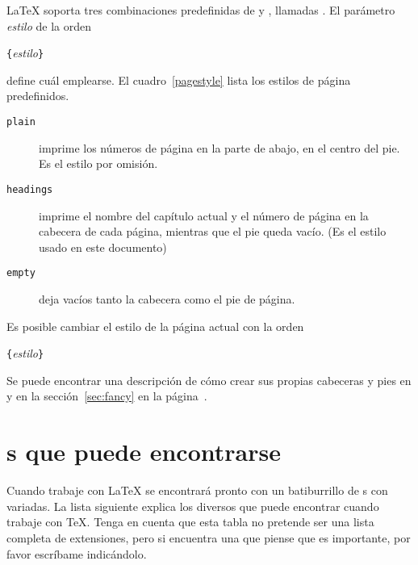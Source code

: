 \LaTeX{} soporta tres combinaciones predefinidas de  y , llamadas .  El parámetro \emph{estilo} de la orden   
\begin{lscommand}
\verb|{|\emph{estilo}\verb|}|
\end{lscommand}
define cuál emplearse. 
El cuadro~\ref{pagestyle} lista los estilos de página predefinidos.

\begin{table}[!hbp]
\caption{Los estilos de página predifinidos de \LaTeX.} \label{pagestyle}
\begin{lined}{\textwidth}
\begin{description}
  \item[\normalfont\texttt{plain}] imprime los números de página en la  parte de abajo, en el centro del pie.  Es el estilo por omisión.
  \item[\normalfont\texttt{headings}] imprime el nombre del capítulo  actual y el número de página en la cabecera de cada página, mientras  que el pie queda vacío.  (Es el estilo usado en este documento)
  \item[\normalfont\texttt{empty}] deja vacíos tanto la cabecera como el  pie de página.
\end{description}
\end{lined}
\end{table}

Es posible cambiar el estilo de la página actual con la orden
\begin{lscommand}
\verb|{|\emph{estilo}\verb|}|
\end{lscommand}
Se puede encontrar una descripción de cómo crear sus propias cabeceras y pies en \companion{} y en la sección~\ref{sec:fancy} en la página~\pageref{sec:fancy}.
%
%

\section{\Filenomo{}s que puede encontrarse}

Cuando trabaje con \LaTeX{} se encontrará pronto con un batiburrillo de \filenomo{}s con  variadas.  La lista siguiente explica los diversos  que puede encontrar cuando trabaje con \TeX{}.  Tenga en cuenta que esta tabla no pretende ser una lista completa de extensiones, pero si encuentra una que piense que es importante, por favor escríbame indicándolo.

